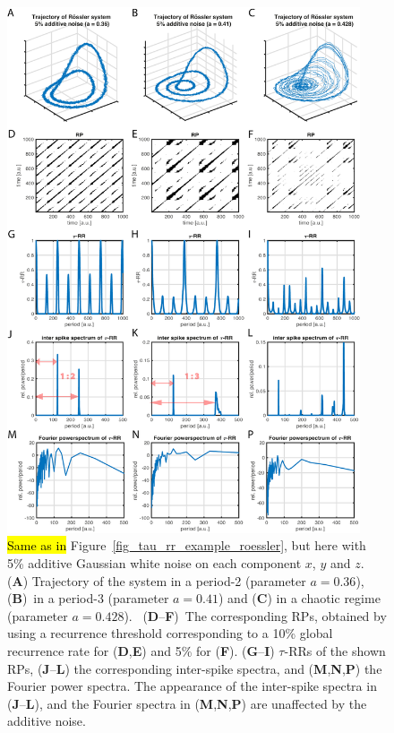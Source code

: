 \documentclass[entropy,article,accept,pdftex,moreauthors]{Definitions/mdpi}
\begin{document}
\begin{figure}[H]\ContinuedFloat

 \includegraphics[width=0.93\textwidth]{./figures/A3B}
 \caption{\hl{Same as in} %
 Figure~\ref{fig_tau_rr_example_roessler}, but here with 5\% additive Gaussian white noise on each component $x$, $y$ and $z$. 
 (\textbf{A}) Trajectory of the system in a period-2 (parameter $a=0.36$), (\textbf{B})~in a period-3 (parameter $a=0.41$) and 
 (\textbf{C}) in a chaotic regime (parameter $a=0.428$). 
\mbox{ (\textbf{D}--\textbf{F})}~The corresponding RPs, obtained by using a recurrence threshold corresponding to a 10\% global 
 recurrence rate for (\textbf{D},\textbf{E}) and 5\% for (\textbf{F}). 
  (\textbf{G}--\textbf{I}) $\tau$-RRs of the shown RPs, 
  (\textbf{J}--\textbf{L}) the corresponding inter-spike spectra, and
  (\textbf{M},\textbf{N},\textbf{P}) the Fourier power spectra. 
 The appearance of the inter-spike spectra 
 in (\textbf{J}--\textbf{L}), and the Fourier spectra in (\textbf{M},\textbf{N},\textbf{P}) are unaffected by the additive noise.}
\label{fig_tau_rr_example_roessler_noise}
\end{figure}
\end{document}
